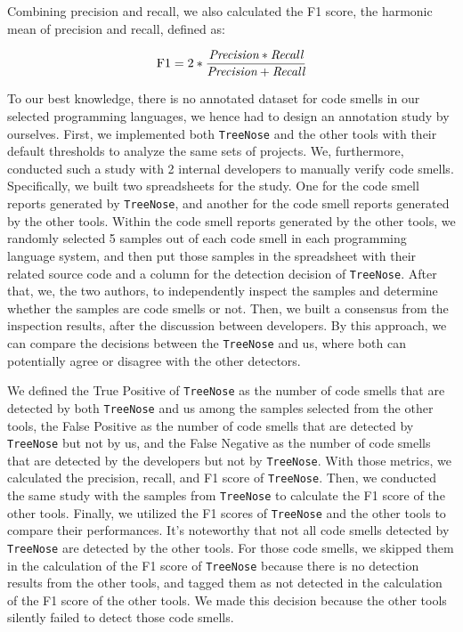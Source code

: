 Combining precision and recall, we also calculated the F1 score, the harmonic
mean of precision and recall, defined as:


\begin{equation}
    \textnormal{F1} = 2 * \frac{\textit{Precision} * \textit{Recall}}{\textit{Precision} + \textit{Recall}}
\end{equation}



To our best knowledge, there is no annotated dataset for code smells in our
selected programming languages, we hence had to design an annotation study by
ourselves. First, we implemented both \texttt{TreeNose} and the other tools
with their default thresholds to analyze the same sets of projects. We,
furthermore, conducted such a study with 2 internal developers to manually
verify code smells. Specifically, we built two spreadsheets for the study. One
for the code smell reports generated by \texttt{TreeNose}, and another for the
code smell reports generated by the other tools. Within the code smell reports
generated by the other tools, we randomly selected 5 samples out of each code
smell in each programming language system, and then put those samples in the
spreadsheet with their related source code and a column for the detection
decision of \texttt{TreeNose}. After that, we, the two authors, to %
independently inspect the samples and determine whether the samples are code
smells or not. Then, we built a consensus from the inspection results, after
the discussion between developers. By this approach, we can compare the
decisions between the \texttt{TreeNose} and us, where both can
potentially agree or disagree with the other detectors.

We defined the True Positive of \texttt{TreeNose} as the number of code smells
that are detected by both \texttt{TreeNose} and us among the %
samples selected from the other tools, the False Positive as the number of code
smells that are detected by \texttt{TreeNose} but not by us, and %
the False Negative as the number of code smells that are detected by the
developers but not by \texttt{TreeNose}. With those metrics, we calculated the
precision, recall, and F1 score of \texttt{TreeNose}. Then, we conducted the
same study with the samples from \texttt{TreeNose} to calculate the F1 score of
the other tools. Finally, we utilized the F1 scores of \texttt{TreeNose} and
the other tools to compare their performances. It's noteworthy that not all
code smells detected by \texttt{TreeNose} are detected by the other tools. For
those code smells, we skipped them in the calculation of the F1 score of
\texttt{TreeNose} because there is no detection results from the other tools,
and tagged them as not detected in the calculation of the F1 score of the other
tools. We made this decision because the other tools silently failed to detect
those code smells.

